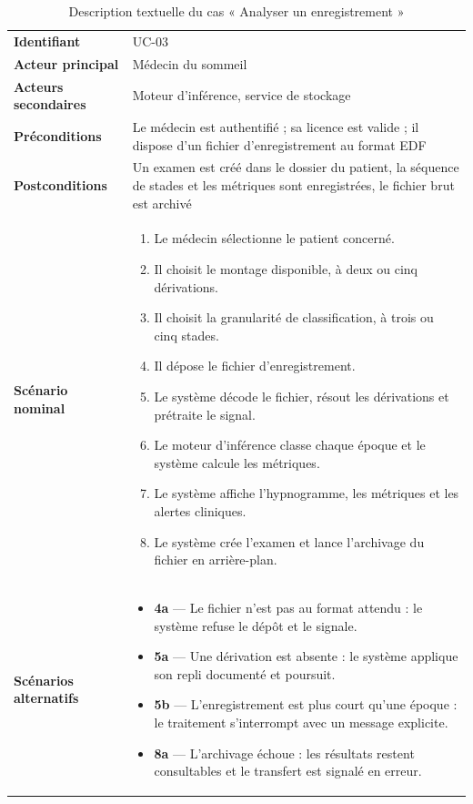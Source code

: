 \begin{table}[H]
\centering
\caption{Description textuelle du cas « Analyser un enregistrement »}
\label{tab:desc-analyse}
\small
\begin{tabular}{@{}L{3.0cm}L{11.4cm}@{}}
\toprule
\textbf{Identifiant} & UC-03 \\
\textbf{Acteur principal} & Médecin du sommeil \\
\textbf{Acteurs secondaires} & Moteur d'inférence, service de stockage \\
\textbf{Préconditions} & Le médecin est authentifié ; sa licence est valide ; il
dispose d'un fichier d'enregistrement au format EDF \\
\textbf{Postconditions} & Un examen est créé dans le dossier du patient, la séquence
de stades et les métriques sont enregistrées, le fichier brut est archivé \\
\midrule
\textbf{Scénario nominal} &
\begin{minipage}[t]{11.2cm}
\begin{enumerate}[leftmargin=1.1em,itemsep=1pt,topsep=2pt]
  \item Le médecin sélectionne le patient concerné.
  \item Il choisit le montage disponible, à deux ou cinq dérivations.
  \item Il choisit la granularité de classification, à trois ou cinq stades.
  \item Il dépose le fichier d'enregistrement.
  \item Le système décode le fichier, résout les dérivations et prétraite le signal.
  \item Le moteur d'inférence classe chaque époque et le système calcule les métriques.
  \item Le système affiche l'hypnogramme, les métriques et les alertes cliniques.
  \item Le système crée l'examen et lance l'archivage du fichier en arrière-plan.
\end{enumerate}
\end{minipage} \\
\midrule
\textbf{Scénarios alternatifs} &
\begin{minipage}[t]{11.2cm}
\begin{itemize}[leftmargin=1.1em,itemsep=1pt,topsep=2pt]
  \item \textbf{4a} --- Le fichier n'est pas au format attendu : le système refuse le
        dépôt et le signale.
  \item \textbf{5a} --- Une dérivation est absente : le système applique son repli
        documenté et poursuit.
  \item \textbf{5b} --- L'enregistrement est plus court qu'une époque : le traitement
        s'interrompt avec un message explicite.
  \item \textbf{8a} --- L'archivage échoue : les résultats restent consultables et le
        transfert est signalé en erreur.
\end{itemize}
\end{minipage} \\
\bottomrule
\end{tabular}
\end{table}

